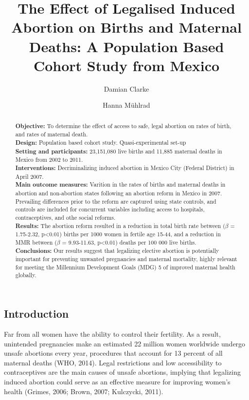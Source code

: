 \documentclass[a4paper, 11pt]{article}
\title{The Effect of Legalised Induced Abortion on Births and Maternal Deaths: 
A Population Based Cohort Study from Mexico}
\author[1]{Damian Clarke}
\author[2]{Hanna Mühlrad}
\affil[2]{University of Gothenburg \\
  \url{hanna.muhlrad@gu.se}}
\affil[1]{University of Oxford \\
  \url{damian.clarke@economics.ox.ac.uk}}
\begin{document}
\begin{spacing}{1.5}

\maketitle
\begin{abstract}
\noindent \textbf{Objective:} To determine the effect of access to safe, legal 
abortion on rates of birth, and rates of maternal death.\\
\textbf{Design:} Population based cohort study. Quasi-experimental set-up \\
\textbf{Setting and participants:} 23,151,080 live births and 11,885 maternal 
deaths in Mexico from 2002 to 2011. \\
\textbf{Interventions:} Decriminalizing induced abortion in Mexico City (Federal District) in April 2007. \\
\textbf{Main outcome measures:} Varition in the rates of births and maternal 
deaths in abortion and non-abortion states following an abortion reform in Mexico 
in 2007.  Prevailing differences prior to the reform are captured using state 
controls, and controls are included for concurrent variables including access to 
hospitals, contraceptives, and othe social reforms.\\
\textbf{Results:} The abortion reform resulted in a reduction in total birth rate between ($\beta$ = 1.75-2.32, p<0.01) births per 1000 women in fertile age 15-44, and a reduction in MMR between ($\beta$ = 9.93-11.63, p<0.01)  deaths per 100 000 live births. \\
\textbf{Conclusions:} Our results suggest that legalizing elective abortion is potentially important for preventing unwanted pregnancies and maternal mortality, highly relevant for meeting the Millennium Development Goals (MDG) 5 of improved maternal health globally.  
\end{abstract}

 

 
 
\newpage
\begin{multicols}{2}
\section{Introduction}
 Far from all women have the ability to control their fertility. As a result, unintended pregnancies make an estimated 22 million women worldwide undergo unsafe abortions every year, procedures that account for 13 percent of all maternal deaths (WHO, 2014). Legal restrictions and low accessibility to contraceptives are the main causes of unsafe abortions, implying that legalizing induced abortion could serve as an effective measure for improving women's health (Grimes, 2006; Brown, 2007; Kulczycki, 2011). 
 

\end{multicols}
\end{spacing}
\end{document}
